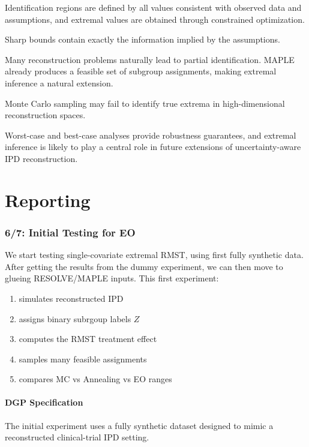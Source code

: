 \documentclass[11pt]{article}
\begin{document}
Identification regions are defined by all values consistent with observed data and assumptions, and extremal values are obtained through constrained optimization.

Sharp bounds contain exactly the information implied by the assumptions.

Many reconstruction problems naturally lead to partial identification. MAPLE already produces a feasible set of subgroup assignments, making extremal inference a natural extension.

Monte Carlo sampling may fail to identify true extrema in high-dimensional reconstruction spaces.

Worst-case and best-case analyses provide robustness guarantees, and extremal inference is likely to play a central role in future extensions of uncertainty-aware IPD reconstruction.

\newpage
\part{Reporting}

\section{6/7: Initial Testing for EO}

We start testing single-covariate extremal RMST, using first fully synthetic data. After getting the results from the dummy experiment, we can then move to glueing RESOLVE/MAPLE inputs. This first experiment:
\begin{enumerate}
\item simulates reconstructed IPD
\item assigns binary subrgoup labels $Z$
\item computes the RMST treatment effect
\item samples many feasible assignments
\item compares MC vs Annealing vs EO ranges
\end{enumerate}

\subsection{DGP Specification}

The initial experiment uses a fully synthetic dataset designed to mimic a reconstructed clinical-trial IPD setting. 
\end{document}
